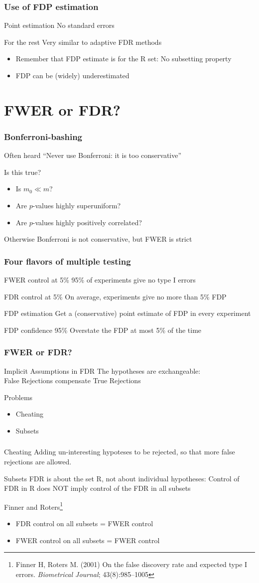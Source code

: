 \documentclass[xcolor={pdftex,dvipsnames,table}]{beamer}
\newcommand{\bb}[1]{\begin{block}{#1}}
\newcommand{\eb}{\end{block}}
\newcommand{\bi}{\begin {itemize}}
\newcommand{\ei}{\end{itemize}}
\newcommand{\bfr}[1]{\begin{frame} \frametitle{#1}}
\begin{document}
\bfr{Use of FDP estimation}
  \bb{Point estimation}
    No standard errors
  \eb
  \bb{For the rest}
    Very similar to adaptive FDR methods
    \bi
       \item Remember that FDP estimate is for the R set: No subsetting property
      \item FDP can be (widely) underestimated
    \ei
  \eb
\end{frame}


\section{FWER or FDR?}

\bfr{Bonferroni-bashing}
  \bb{Often heard}
    ``Never use Bonferroni: it is too conservative''
  \eb
  \bb{Is this true?}
    \bi
      \item Is $m_0 \ll m$?
      \item Are $p$-values highly superuniform?
      \item Are $p$-values highly positively correlated?
    \ei
  \eb
  \bb{Otherwise}
    Bonferroni is not conservative, but FWER is strict
  \eb
\end{frame}


\bfr{Four flavors of multiple testing}
  \bb{FWER control at 5\%}
    95\% of experiments give no type I errors
  \eb
  \bb{FDR control at 5\%}
    On average, experiments give no more than 5\% FDP
  \eb
  \bb{FDP estimation}
    Get a (conservative) point estimate of FDP in every experiment
  \eb
  \bb{FDP confidence 95\%}
    Overstate the FDP at most 5\% of the time
  \eb
\end{frame}

\bfr{FWER or FDR?}
  \bb{Implicit Assumptions in FDR}
    The hypotheses are exchangeable:
    \\ False Rejections compensate True Rejections
  \eb
  \pause
  \bb{Problems}
    \bi
     \item Cheating 
     \item Subsets
    \ei
  \eb
\end{frame}

\bfr{}
\bb{Cheating}
Adding un-interesting hypoteses to be rejected, so that more false rejections are allowed.
\eb
\pause
\bb{Subsets}
FDR is about the set R, not about individual hypotheses:
Control of FDR in R does NOT imply control of the FDR in all subsets\\
\eb
\bb{Finner and Roters\footnote{Finner H, Roters M. (2001) On the false discovery rate and expected type I errors. {\it Biometrical Journal}; 43(8):985--1005}}
    \bi
      \item FDR control on all subsets = FWER control
      \item FWER control on all subsets = FWER control
    \ei
\eb
\end{frame}
\end{document}
